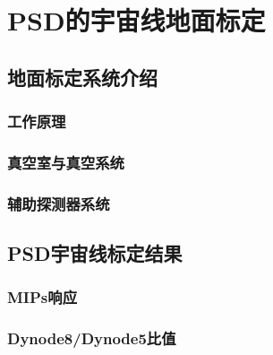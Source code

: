 \chapter{PSD的宇宙线地面标定}
\label{ch:cosmicray_calibration}
\section{地面标定系统介绍}
\subsection{工作原理}
\subsection{真空室与真空系统}
\subsection{辅助探测器系统}


\section{PSD宇宙线标定结果}
\subsection{MIPs响应}
\subsection{Dynode8/Dynode5比值}
